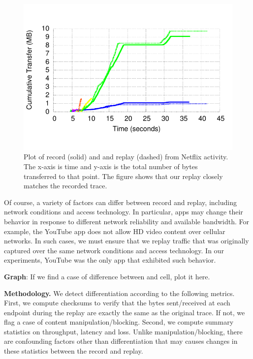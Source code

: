 \begin{figure}
\centering
\includegraphics[width=0.9\linewidth]{plots/netflix_seqnum_wifi_vs_cell.pdf}
\caption{Plot of record (solid) and and replay (dashed) from Netflix activity. The x-axis is time and y-axis is the 
total number of bytes transferred to that point. The figure shows that our replay closely matches 
the recorded trace.}
\vspace{\postfigspace}
\label{fig:replaySimilarity}
\end{figure}

Of course, a variety of factors can differ between record and replay, including network 
conditions and access technology. In particular, apps may change their behavior in response 
to different network reliability and available bandwidth. For example, the YouTube app does not 
allow HD video content over cellular networks. In such cases, we must ensure that we replay 
traffic that was originally captured over the same network conditions and access technology. 
In our experiments, YouTube was the only app that exhibited such behavior.


\textbf{Graph}: If we find a case of difference between \wifi and cell, plot it here.



\noindent\textbf{Methodology.} We detect differentiation according to the following metrics. First, we 
compute checksums to verify that the bytes sent/received at each endpoint during the replay are 
exactly the same as the original trace. If not, we flag a case of content manipulation/blocking. Second, we
compute summary statistics on throughput, latency and loss. Unlike manipulation/blocking, there are 
confounding factors other than differentiation that may causes changes in these statistics between the 
record and replay.

